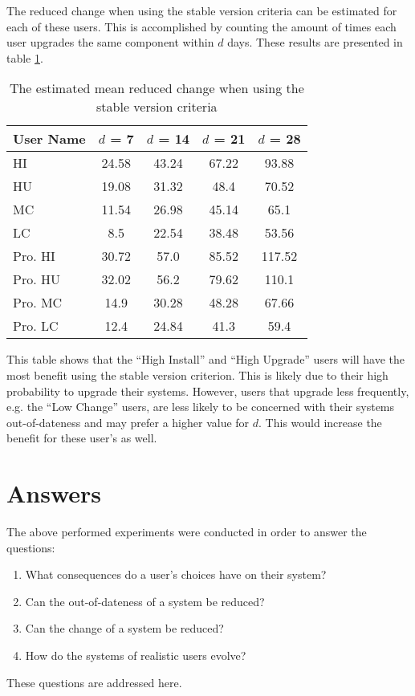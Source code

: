 The reduced change when using the stable version criteria can be estimated for each of these users.
This is accomplished by counting the amount of times each user upgrades the same component within $d$ days.
These results are presented in table \ref{exp.tblq6sv}.
\begin{table}[h!]
\centering
\begin{tabular}{|l | c | c | c | c |}
\hline
User Name 	& $d$ = 7 	&  $d$ = 14 	&	$d$ = 21 	&	$d$ = 28 	\\ \hline
HI 			&24.58 	&	43.24&	 67.22&	 93.88\\
HU 			&19.08 	&	31.32&	 48.4&	 70.52\\
MC 			&11.54 	&	26.98&	 45.14&	 65.1\\
LC 			&8.5 	&	22.54&	 38.48&	 53.56\\
Pro. HI 	&30.72 	&	57.0&	 85.52&	 117.52\\
Pro. HU 	&32.02 	&	56.2&	 79.62&	 110.1\\
Pro. MC 	&14.9 	&	30.28&	 48.28&	 67.66\\
Pro. LC 	&12.4 	&	24.84&	 41.3&	 59.4\\ \hline
\end{tabular}
\caption{The estimated mean reduced change when using the stable version criteria}
\label{exp.tblq6sv}
\end{table}

This table shows that the ``High Install'' and ``High Upgrade'' users will have the most benefit using the stable version criterion.
This is likely due to their high probability to upgrade their systems.
However, users that upgrade less frequently, e.g. the ``Low Change'' users, are less likely to be concerned with their systems out-of-dateness and may prefer a higher value for $d$.
This would increase the benefit for these user's as well.

\section{Answers}
The above performed experiments were conducted in order to answer the questions:
\begin{enumerate}
  \item What consequences do a user's choices have on their system?
  \item Can the out-of-dateness of a system be reduced?
  \item Can the change of a system be reduced?
  \item How do the systems of realistic users evolve?
\end{enumerate}
These questions are addressed here.

